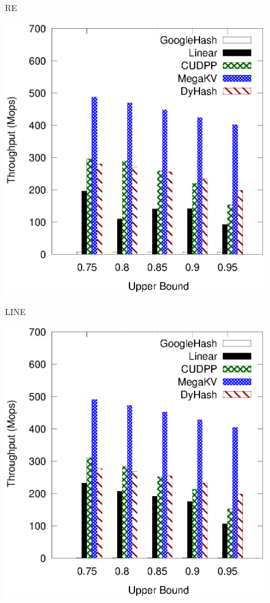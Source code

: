 \begin{figure}[h]
\begin{minipage}{0.19\linewidth}
		\centerline{RE}
	\end{minipage}
	\hfill
	\begin{minipage}{0.19\linewidth}\centering
		\includegraphics[width=\linewidth]{pic/static-upper/upper_insert_tpch.eps}
		\centerline{LINE}
	\end{minipage}
	\hfill
	\begin{minipage}{0.19\linewidth}\centering
		\includegraphics[width=\linewidth]{pic/static-upper/upper_insert_random.eps}

\end{minipage}
\end{figure}
